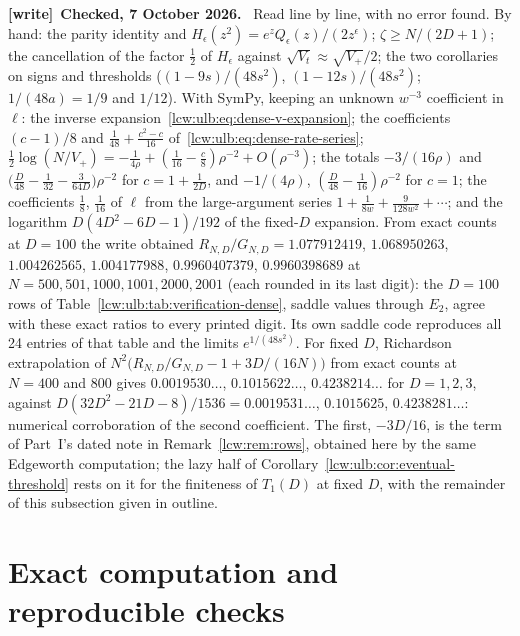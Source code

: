 \documentclass[11pt,letterpaper]{article}
\theoremstyle{remark}\newtheorem{remark}[theorem]{Remark}
\newenvironment{writenote}[1][]{\par\smallskip\begingroup\small
 \noindent\textbf{[write]}\if\relax\detokenize{#1}\relax\else~\textbf{#1.}\fi\ }%
 {\par\endgroup\smallskip}
\begin{document}
\begin{writenote}[Checked, 7 October 2026]
Read line by line, with no error found. By hand: the parity identity and
$H_\epsilon(z^2)=e^zQ_\epsilon(z)/(2z^\epsilon)$; $\zeta\ge N/(2D+1)$; the
cancellation of the factor $\frac12$ of $H_\epsilon$ against
$\sqrt{V_t}\approx\sqrt{V_+}/2$; the two corollaries on signs and thresholds
($(1-9s)/(48s^2)$, $(1-12s)/(48s^2)$; $1/(48a)=1/9$ and $1/12$). With SymPy,
keeping an unknown $w^{-3}$ coefficient in $\ell$: the inverse
expansion~\eqref{lcw:ulb:eq:dense-v-expansion}; the coefficients
$(c-1)/8$ and $\frac1{48}+\frac{c^2-c}{16}$ of~\eqref{lcw:ulb:eq:dense-rate-series};
$\frac12\log(N/V_+)=-\frac1{4\rho}+(\frac1{16}-\frac c8)\rho^{-2}+O(\rho^{-3})$;
the totals $-3/(16\rho)$ and $\bigl(\frac D{48}-\frac1{32}-\frac3{64D}\bigr)\rho^{-2}$
for $c=1+\frac1{2D}$, and $-1/(4\rho)$, $(\frac D{48}-\frac1{16})\rho^{-2}$ for
$c=1$; the coefficients $\frac18$, $\frac1{16}$ of $\ell$ from the
large-argument series $1+\frac1{8w}+\frac9{128w^2}+\cdots$; and the logarithm
$D(4D^2-6D-1)/192$ of the fixed-$D$ expansion. From exact counts at $D=100$
the write obtained $R_{N,D}/G_{N,D}=1.077912419$, $1.068950263$,
$1.004262565$, $1.004177988$, $0.9960407379$, $0.9960398689$ at
$N=500,501,1000,1001,2000,2001$ (each rounded in its last digit): the
$D=100$ rows of Table~\ref{lcw:ulb:tab:verification-dense}, saddle values
through $E_2$, agree with these exact ratios to every printed digit. Its own
saddle code reproduces all 24 entries of that table and the limits
$e^{1/(48s^2)}$. For fixed $D$, Richardson extrapolation of
$N^2\bigl(R_{N,D}/G_{N,D}-1+3D/(16N)\bigr)$ from exact counts at $N=400$ and
$800$ gives $0.0019530\ldots$, $0.1015622\ldots$, $0.4238214\ldots$ for
$D=1,2,3$, against $D(32D^2-21D-8)/1536=0.0019531\ldots$, $0.1015625$,
$0.4238281\ldots$: numerical corroboration of the second coefficient. The
first, $-3D/16$, is the term of Part~I's dated note in
Remark~\ref{lcw:rem:rows}, obtained here by the same Edgeworth computation;
the lazy half of Corollary~\ref{lcw:ulb:cor:eventual-threshold} rests on it
for the finiteness of $T_1(D)$ at fixed $D$, with the remainder of this
subsection given in outline.
\end{writenote}

\section{Exact computation and reproducible checks}
\label{lcw:ulb:sec:computation}
\end{document}
